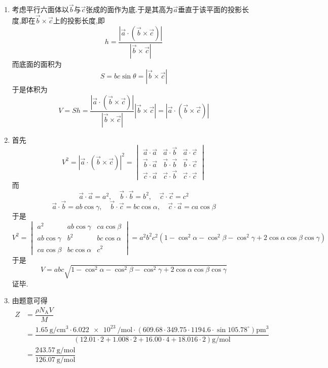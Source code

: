 \documentclass{ctexart}
\begin{document}
\begin{solution}
    \begin{enumerate}[label=\tbf{(\alph*)}]
        \item 考虑平行六面体以$\vec{b}$与$\vec{c}$张成的面作为底.于是其高为$\vec{a}$垂直于该平面的投影长度,即在$\vec{b}\times\vec{c}$上的投影长度,即
        \[h=\dfrac{\left|\vec{a}\cdot\left(\vec{b}\times\vec{c}\right)\right|}{\left|\vec{b}\times\vec{c}\right|}\]
        而底面的面积为
        \[S=bc\sin\theta=\left|\vec{b}\times\vec{c}\right|\]
        于是体积为
        \[V=Sh=\dfrac{\left|\vec{a}\cdot\left(\vec{b}\times\vec{c}\right)\right|}{\left|\vec{b}\times\vec{c}\right|}\left|\vec{b}\times\vec{c}\right|=\left|\vec{a}\cdot(\vec{b}\times\vec{c})\right|\]
        \item 首先
        \[V^2=\left|\vec{a}\cdot(\vec{b}\times\vec{c})\right|^2=\begin{vmatrix}
            \vec{a}\cdot\vec{a}&\vec{a}\cdot\vec{b}&\vec{a}\cdot\vec{c}\\
            \vec{b}\cdot\vec{a}&\vec{b}\cdot\vec{b}&\vec{b}\cdot\vec{c}\\
            \vec{c}\cdot\vec{a}&\vec{c}\cdot\vec{b}&\vec{c}\cdot\vec{c}
        \end{vmatrix}\]
        而
        \[\vec{a}\cdot\vec{a}=a^2,\quad\vec{b}\cdot\vec{b}=b^2,\quad\vec{c}\cdot\vec{c}=c^2\]
        \[\vec{a}\cdot\vec{b}=ab\cos\gamma,\quad\vec{b}\cdot\vec{c}=bc\cos\alpha,\quad\vec{c}\cdot\vec{a}=ca\cos\beta\]
        于是
        \[V^2=\begin{vmatrix}
            a^2&ab\cos\gamma&ca\cos\beta\\
            ab\cos\gamma&b^2&bc\cos\alpha\\
            ca\cos\beta&bc\cos\alpha&c^2
        \end{vmatrix}=a^2b^2c^2(1-\cos^2\alpha-\cos^2\beta-\cos^2\gamma+2\cos\alpha\cos\beta\cos\gamma)\]
        于是
        \[V=abc\sqrt{1-\cos^2\alpha-\cos^2\beta-\cos^2\gamma+2\cos\alpha\cos\beta\cos\gamma}\]
        证毕.
        \item 由题意可得
        \[\begin{aligned}
            Z
            &=\dfrac{\rho N_{\text{A}}V}{M}\\
            &=\dfrac{\SI{1.65}{\gram\per\centi\meter^3}\cdot\SI{6.022e23}{\per\mole}\cdot(609.68\cdot349.75\cdot1194.6\cdot\sin105.78^\circ)\si{\pico\meter^3}}{(12.01\cdot2+1.008\cdot2+16.00\cdot4+18.016\cdot2)\si{\gram\per\mol}}\\
            &=\dfrac{\SI{243.57}{\gram\per\mole}}{\SI{126.07}{\gram\per\mole}}\\

\end{aligned}\]
\end{enumerate}
\end{solution}
\end{document}
